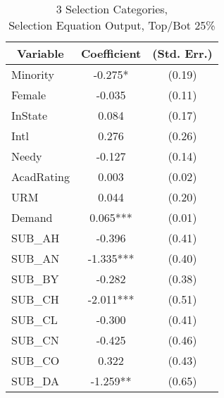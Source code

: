 \begin{table}[htb]\centering
  \begin{threeparttable}
    \caption{3 Selection Categories, \\Selection Equation Output, Top/Bot 25\%}\label{table:b4}
    \begin{tabular}{l c c}
      \hline\hline 
      \multicolumn{1}{c}{\textbf{Variable}} & {\textbf{Coefficient}} & \textbf{(Std. Err.)} \\ 
      \hline
      \hline 
      Minority                              & -0.275*                & (0.19)               \\
      Female                                & -0.035                 & (0.11)               \\
      InState                                    & 0.084                  & (0.17)               \\
      Intl                                  & 0.276                  & (0.26)               \\
      Needy                                 & -0.127                 & (0.14)               \\
      AcadRating                            & 0.003                  & (0.02)               \\
      URM                                   & 0.044                  & (0.20)               \\
      Demand                                & 0.065***               & (0.01)               \\
      SUB\_AH                               & -0.396                 & (0.41)               \\
      SUB\_AN                               & -1.335***              & (0.40)               \\
      SUB\_BY                               & -0.282                 & (0.38)               \\
      SUB\_CH                               & -2.011***              & (0.51)               \\
      SUB\_CL                               & -0.300                 & (0.41)               \\
      SUB\_CN                               & -0.425                 & (0.46)               \\
      SUB\_CO                               & 0.322                  & (0.43)               \\
      SUB\_DA                               & -1.259**               & (0.65)               \\

\end{tabular}
\end{threeparttable}
\end{table}
